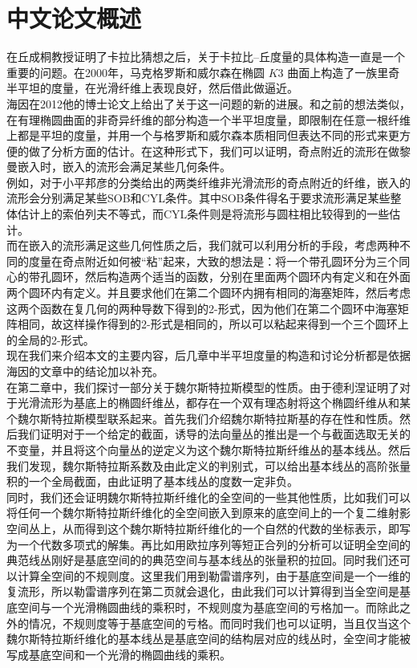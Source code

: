 
\chapter{中文论文概述}
在丘成桐教授证明了卡拉比猜想之后，关于卡拉比--丘度量的具体构造一直是一个重要的问题。在2000年，马克格罗斯和威尔森在椭圆 $K3$ 曲面上构造了一族里奇半平坦的度量，在光滑纤维上表现良好，然后借此做逼近。\\ \indent
海因在2012他的博士论文上给出了关于这一问题的新的进展。和之前的想法类似，在有理椭圆曲面的非奇异纤维的部分构造一个半平坦度量，即限制在任意一根纤维上都是平坦的度量，并用一个与格罗斯和威尔森本质相同但表达不同的形式来更方便的做了分析方面的估计。在这种形式下，我们可以证明，奇点附近的流形在做黎曼嵌入时，嵌入的流形会满足某些几何条件。\\ \indent
例如，对于小平邦彦的分类给出的两类纤维非光滑流形的奇点附近的纤维，嵌入的流形会分别满足某些SOB和CYL条件。其中SOB条件得名于要求流形满足某些整体估计上的索伯列夫不等式，而CYL条件则是将流形与圆柱相比较得到的一些估计。\\ \indent
而在嵌入的流形满足这些几何性质之后，我们就可以利用分析的手段，考虑两种不同的度量在奇点附近如何被“粘”起来，大致的想法是：将一个带孔圆环分为三个同心的带孔圆环，然后构造两个适当的函数，分别在里面两个圆环内有定义和在外面两个圆环内有定义。并且要求他们在第二个圆环内拥有相同的海塞矩阵，然后考虑这两个函数在复几何的两种导数下得到的2-形式，因为他们在第二个圆环中海塞矩阵相同，故这样操作得到的2-形式是相同的，所以可以粘起来得到一个三个圆环上的全局的2-形式。\\ \indent
现在我们来介绍本文的主要内容，后几章中半平坦度量的构造和讨论分析都是依据海因的文章中的结论加以补充。\\ \indent
在第二章中，我们探讨一部分关于魏尔斯特拉斯模型的性质。由于德利涅证明了对于光滑流形为基底上的椭圆纤维丛，都存在一个双有理态射将这个椭圆纤维从和某个魏尔斯特拉斯模型联系起来。首先我们介绍魏尔斯特拉斯基的存在性和性质。然后我们证明对于一个给定的截面，诱导的法向量丛的推出是一个与截面选取无关的不变量，并且将这个向量丛的逆定义为这个魏尔斯特拉斯纤维丛的基本线丛。然后我们发现，魏尔斯特拉斯系数及由此定义的判别式，可以给出基本线丛的高阶张量积的一个全局截面，由此证明了基本线丛的度数一定非负。\\ \indent
同时，我们还会证明魏尔斯特拉斯纤维化的全空间的一些其他性质，比如我们可以将任何一个魏尔斯特拉斯纤维化的全空间嵌入到原来的底空间上的一个复二维射影空间丛上，从而得到这个魏尔斯特拉斯纤维化的一个自然的代数的坐标表示，即写为一个代数多项式的解集。再比如用欧拉序列等短正合列的分析可以证明全空间的典范线丛刚好是基底空间的的典范空间与基本线丛的张量积的拉回。同时我们还可以计算全空间的不规则度。这里我们用到勒雷谱序列，由于基底空间是一个一维的复流形，所以勒雷谱序列在第二页就会退化，由此我们可以计算得到当全空间是基底空间与一个光滑椭圆曲线的乘积时，不规则度为基底空间的亏格加一。而除此之外的情况，不规则度等于基底空间的亏格。而同时我们也可以证明，当且仅当这个魏尔斯特拉斯纤维化的基本线丛是基底空间的结构层对应的线丛时，全空间才能被写成基底空间和一个光滑的椭圆曲线的乘积。\\ \indent
